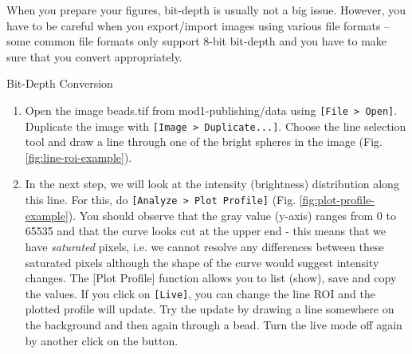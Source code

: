 When you prepare your figures, bit-depth is usually not a big issue. However, you have to be careful when you export/import images using various file formats -- some common file formats only support 8-bit bit-depth and you have to make sure that you convert appropriately.

\begin{taskbox}{Bit-Depth Conversion}
\begin{enumerate}
	\item Open the image beads.tif from mod1-publishing/data using \texttt{[File > Open]}. Duplicate the image with \texttt{[Image > Duplicate...]}. Choose the line selection tool and draw a line through one of the bright spheres in the image (Fig. \ref{fig:line-roi-example}).	
	
	\begin{minipage}[t]{\linewidth}
		\begin{center}
		\medskip
		\label{fig:line-roi-example}
		\end{center}
	\end{minipage}
	
	\item In the next step, we will look at the intensity (brightness) distribution along this line. For this, do \texttt{[Analyze > Plot Profile]} (Fig. \ref{fig:plot-profile-example}). You should observe that the gray value (y-axis) ranges from 0 to 65535 and that the curve looks cut at the upper end - this means that we have \emph{saturated} pixels, i.e. we cannot resolve any differences between these saturated pixels although the shape of the curve would suggest intensity changes. The [Plot Profile] function allows you to list (show), save and copy the values. If you click on \texttt{[Live]}, you can change the line ROI and the plotted profile will update. Try the update by drawing a line somewhere on the background and then again through a bead. Turn the live mode off again by another click on the button. 


\end{enumerate}
\end{taskbox}
